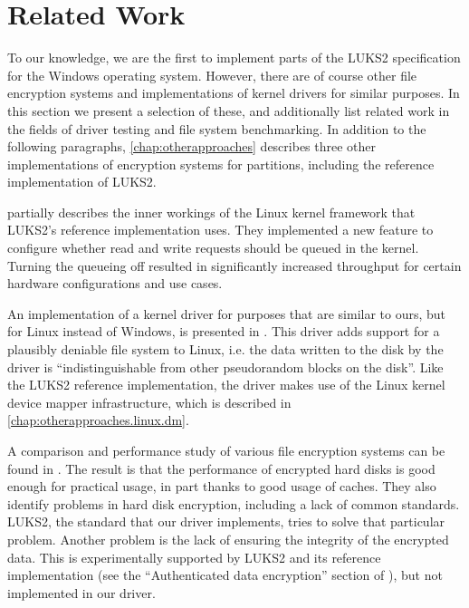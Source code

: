 \chapter{Related Work}
\label{chap:relatedwork}
To our knowledge, we are the first to implement parts of the LUKS2 specification for the Windows operating system. However, there are of course other file encryption systems and implementations of kernel drivers for similar purposes. In this section we present a selection of these, and additionally list related work in the fields of driver testing and file system benchmarking. In addition to the following paragraphs, \autoref{chap:otherapproaches} describes three other implementations of encryption systems for partitions, including the reference implementation of LUKS2.

\cite{Korchagin2020} partially describes the inner workings of the Linux kernel framework that LUKS2's reference implementation uses. They implemented a new feature to configure whether read and write requests should be queued in the kernel. Turning the queueing off resulted in significantly increased throughput for certain hardware configurations and use cases. 

An implementation of a kernel driver for purposes that are similar to ours, but for Linux instead of Windows, is presented in \cite{Barker2019}. This driver adds support for a plausibly deniable file system to Linux, i.e. the data written to the disk by the driver is ``indistinguishable from other pseudorandom blocks on the disk''. Like the LUKS2 reference implementation, the driver makes use of the Linux kernel device mapper infrastructure, which is described in \autoref{chap:otherapproaches.linux.dm}.

A comparison and performance study of various file encryption systems can be found in \cite{Wright2003}. The result is that the performance of encrypted hard disks is good enough for practical usage, in part thanks to good usage of caches. They also identify problems in hard disk encryption, including a lack of common standards. LUKS2, the standard that our driver implements, tries to solve that particular problem. Another problem is the lack of ensuring the integrity of the encrypted data. This is experimentally supported by LUKS2 and its reference implementation (see the ``Authenticated data encryption'' section of \cite{ManCryptsetup}), but not implemented in our driver.

